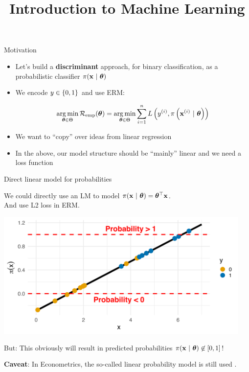 \documentclass[11pt,compress,t,notes=noshow, xcolor=table]{beamer}
\title{Introduction to Machine Learning}
\begin{document}

\framebreak


\begin{vbframe}{Motivation}

\begin{itemize}

\item Let's build a \textbf{discriminant} approach, for binary classification, as a probabilistic classifier $\pi(\mathbf{x}~|~ \bm{\theta})$

\item We encode $y \in \{0, 1\}$ and use ERM:
  
$$ \mathop{\mathrm{arg\,min}}_{\bm{\theta} \in \Theta} \mathcal{R}_{\text{emp}}(\bm{\theta}) = \mathop{\mathrm{arg\,min}}_{\bm{\theta} \in \Theta} \sum\limits_{i=1}^n L\left(y^{(i)}, \pi\left(\mathbf{x}^{(i)} ~|~ \bm{\theta}\right)\right)$$

\item We want to \enquote{copy} over ideas from linear regression

\item In the above, our model structure should be \enquote{mainly} linear and we need a loss function

\end{itemize}


\end{vbframe}

\begin{vbframe}{Direct linear model for probabilities}

We could directly use an LM to model $\pi(\mathbf{x}~|~ \bm{\theta}) = \bm{\theta}^\top \mathbf{x}$.\\
And use L2 loss in ERM.

\lz 

{\centering \includegraphics[width=0.95\textwidth]{figure/preds_with_probs-linear.png}
}

But: This obviously will result in predicted probabilities $\pi(\mathbf{x}~|~ \bm{\theta}) \not\in [0,1]$!

\textbf{Caveat}: In Econometrics, the so-called linear probability model is still used .

\end{vbframe}
\end{document}
